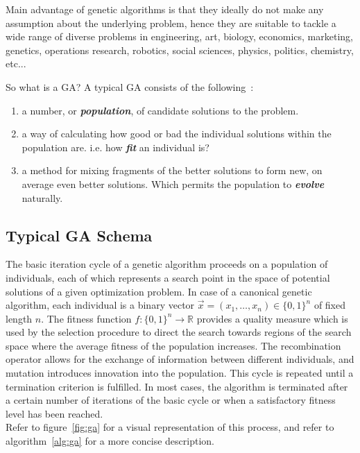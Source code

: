 \documentclass[12pt]{article}
\newcommand{\textem}[1]{\textbf{\emph{#1}}}
\begin{document}
Main advantage of genetic algorithms is that they ideally do not make
any assumption about the underlying problem, hence they are suitable to tackle
a wide range of diverse problems in
engineering, art, biology, economics, marketing, genetics,
operations research, robotics, social sciences, physics, politics, chemistry,
etc... \cite[ch.~6]{coley}

\noindent
So what is a GA? A typical GA consists of the following~\cite[ch.~1]{coley}:
\vspace{-5mm}
\begin{enumerate}
\setlength{\parskip}{0em}

\item
a number, or \textem{population}, of candidate solutions to the problem.

\item
a way of calculating how good or bad the individual solutions within the
population are.
i.e. how \textem{fit} an individual is?

\item
a method for mixing fragments of the better solutions to form new, on
average even better solutions.
Which permits the population to \textem{evolve} naturally.

\end{enumerate}

\subsection{Typical GA Schema}
The basic iteration cycle of a genetic algorithm proceeds on a population
of individuals, each of which represents a search point in the space
of potential solutions of a given optimization problem.
In case of a canonical genetic algorithm, each individual is a binary vector
$ \vec{x} = ( x_1, \dots, x_n ) \in \{0, 1\}^n $
of fixed length $n$.
The fitness function
$ f: \{0, 1\}^n \rightarrow \mathbb{R} $
provides a quality measure which is used by the selection procedure to direct
the search towards regions of the search space where the
average fitness of the population increases.
The recombination operator
allows for the exchange of information between different individuals,
and mutation introduces innovation into the population.
This cycle is repeated until a termination criterion is fulfilled.
In most cases, the algorithm is terminated after a certain number of
iterations of the basic cycle or when a satisfactory fitness
level has been reached.\\
Refer to figure~\ref{fig:ga} for a visual representation of this process,
and refer to algorithm~\ref{alg:ga} for a more concise description.
\end{document}
